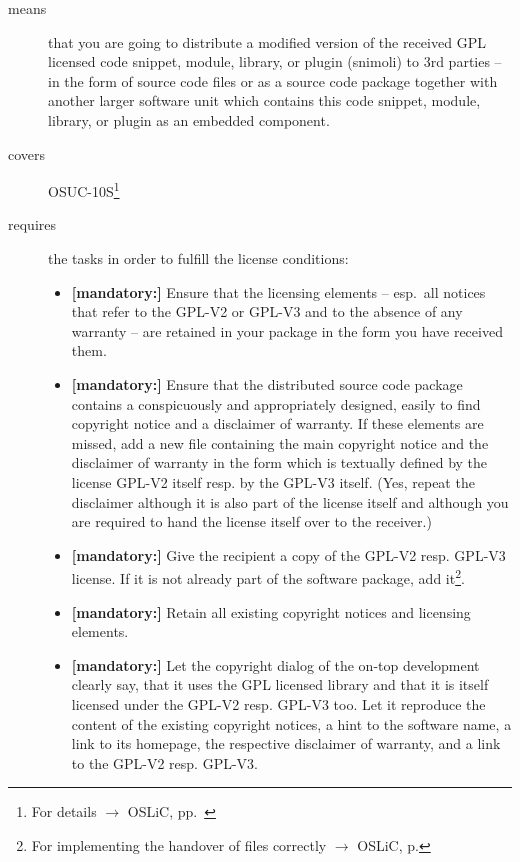 \begin{description}
\item[means] that you are going to distribute a modified version of the received
GPL licensed code snippet, module, library, or plugin (snimoli) to 3rd parties
-- in the form of source code files or as a source code package together with
another larger software unit which contains this code snippet, module, library,
or plugin as an embedded component.
\item[covers] OSUC-10S\footnote{For details $\rightarrow$ OSLiC, pp.\
\pageref{OSUC-10S-DEF}}
\item[requires] the tasks in order to fulfill the license conditions:
\begin{itemize}


  \item \textbf{[mandatory:]} Ensure that the licensing elements -- esp.\ all
  notices that refer to the GPL-V2 or GPL-V3 and to the absence of any
  warranty -- are retained in your package in the form you have received them.

  \item \textbf{[mandatory:]} Ensure that the distributed source code package
  contains a conspicuously and appropriately designed, easily to find copyright
  notice and a disclaimer of warranty. If these elements are missed, add a new
  file containing the main copyright notice and the disclaimer of warranty in
  the form which is textually defined by the license GPL-V2 itself resp. by the
  GPL-V3 itself. (Yes, repeat the disclaimer although it is also part of the
  license itself and although you are required to hand the license itself over
  to the receiver.)
  
  \item \textbf{[mandatory:]} Give the recipient a copy of the GPL-V2 resp.
  GPL-V3 license. If it is not already part of the software package, add
  it\footnote{For implementing the handover of files correctly $\rightarrow$
  OSLiC, p. \pageref{DistributingFilesHint}}.
  
  \item \textbf{[mandatory:]} Retain all existing copyright notices and
  licensing elements.
  
  \item \textbf{[mandatory:]} Let the copyright dialog of the on-top development
  clearly say, that it uses the GPL licensed library and that it is itself
  licensed under the GPL-V2 resp. GPL-V3 too. Let it reproduce the content of
  the existing copyright notices, a hint to the software name, a link to its
  homepage, the respective disclaimer of warranty, and a link to the GPL-V2
  resp. GPL-V3.
    

\end{itemize}
\end{description}
